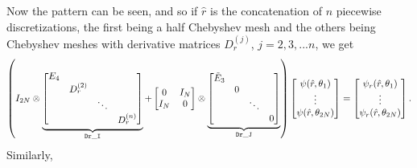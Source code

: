 Now the pattern can be seen, and so if $\hat{r}$ is the concatenation
of $n$ piecewise discretizations, the first being a half Chebyshev
mesh and the others being Chebyshev meshes with derivative matrices
$D_r^{(j)}$, $j = 2,3,...n$, we get
\begin{align*}
 \left(
  I_{2N} \otimes
  \underbrace{
  \begin{bmatrix}
   E_4 &           &        & \\
       & D_r^{(2)} &        & \\
       &           & \ddots & \\
       &           &        & D_r^{(n)}
  \end{bmatrix}
  }_{\tt Dr\_I}
   +
  \begin{bmatrix} 0 & I_N \\ I_N & 0 \end{bmatrix} \otimes
  \underbrace{
  \begin{bmatrix}
   \tilde{E}_3 &   &        & \\
               & 0 &        & \\
               &   & \ddots & \\
               &   &        & 0
  \end{bmatrix}
  }_{\tt Dr\_J}
 \right)
 \begin{bmatrix}
  \psi(\hat{r},\theta_1) \\ \vdots \\ \psi(\hat{r},\theta_{2N})
 \end{bmatrix}
 =
 \begin{bmatrix}
  \psi_r(\hat{r},\theta_1) \\ \vdots \\ \psi_r(\hat{r},\theta_{2N})
 \end{bmatrix}.
\end{align*}
Similarly,
